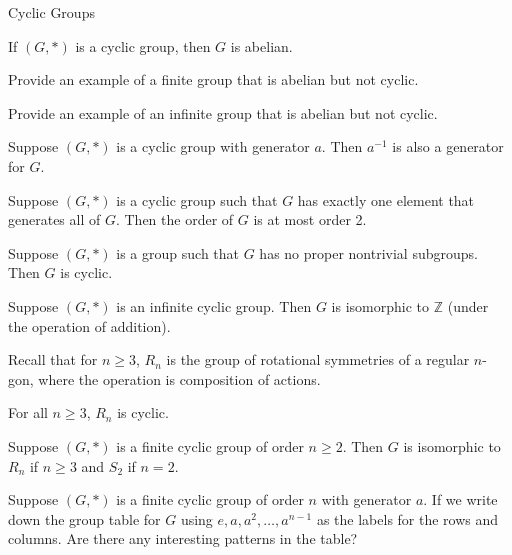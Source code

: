 \begin{section}{Cyclic Groups}
\begin{theorem}
If \((G,*)\) is a cyclic group, then \(G\) is abelian.
\end{theorem}

\begin{exercise}
Provide an example of a finite group that is abelian but not cyclic.
\end{exercise}

\begin{exercise}
Provide an example of an infinite group that is abelian but not cyclic.
\end{exercise}

\begin{theorem}
Suppose \((G,*)\) is a cyclic group with generator \(a\).  Then \(a^{-1}\) is also a generator for \(G\).
\end{theorem}

\begin{theorem}
Suppose \((G,*)\) is a cyclic group such that \(G\) has exactly one element that generates all of \(G\).  Then the order of \(G\) is at most order 2.   
\end{theorem}

\begin{theorem}
Suppose \((G,*)\) is a group such that \(G\) has no proper nontrivial subgroups.  Then \(G\) is cyclic.
\end{theorem}

\begin{theorem}\label{thm:infinite_cyclic_groups}
Suppose \((G,*)\) is an infinite cyclic group.  Then \(G\) is isomorphic to \(\mathbb{Z}\) (under the operation of addition).
\end{theorem}

Recall that for \(n\geq3\), \(R_n\) is the group of rotational symmetries of a regular \(n\)-gon, where the operation is composition of actions.

\begin{theorem}
For all \(n\geq 3\), \(R_n\) is cyclic.
\end{theorem}

\begin{theorem}\label{thm:finite_cyclic_groups}
Suppose \((G,*)\) is a finite cyclic group of order \(n\geq 2\).  Then \(G\) is isomorphic to \(R_n\) if \(n\geq 3\) and \(S_2\) if \(n=2\).
\end{theorem}

\begin{exercise}
Suppose \((G,*)\) is a finite cyclic group of order \(n\) with generator \(a\).  If we write down the group table for \(G\) using \(e, a, a^2, \ldots, a^{n-1}\) as the labels for the rows and columns.  Are there any interesting patterns in the table?
\end{exercise}


\end{section}
